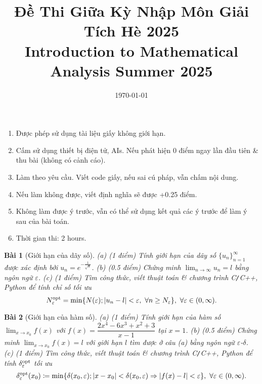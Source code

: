 \documentclass[12pt]{article}
\title{Đề Thi Giữa Kỳ Nhập Môn Giải Tích Hè 2025\\
	Introduction to Mathematical Analysis Summer 2025}
\date{\today}
\newtheorem{baitoan}{Bài}
\begin{document}
\maketitle
{}
\begin{enumerate}
	\item Được phép sử dụng tài liệu giấy không giới hạn.
	\item Cấm sử dụng thiết bị điện tử, AIs. Nếu phát hiện 0 điểm ngay lần đầu tiên \& thu bài (không có cảnh cáo).
	\item Làm theo yêu cầu. Viết code giấy, nếu sai cú pháp, vẫn chấm nội dung.
	\item Nếu làm không được, viết định nghĩa sẽ được +0.25 điểm.
	\item Không làm được ý trước, vẫn có thể sử dụng kết quả các ý trước để làm ý sau của bài toán.
    \item Thời gian thi: 2 hours.
\end{enumerate}

\begin{baitoan}[Giới hạn của dãy số]
	(a) {\rm(1 điểm)} Tính giới hạn của dãy số $\{u_n\}_{n=1}^\infty$ được xác định bởi $u_n = e^{-\frac{1}{\sqrt{n}}}$. (b) {\rm(0.5 điểm)} Chứng minh $\lim_{n\to\infty} u_n = l$ bằng ngôn ngữ $\varepsilon$. (c) {\rm(1 điểm)} Tìm công thức, viết thuật toán \& chương trình {\sf C{\tt/}C++, Python} để tính chỉ số tối ưu
	\begin{equation*}
		N_\varepsilon^{\rm opt} = \min\{N(\varepsilon);|u_n - l| < \varepsilon,\ \forall n\ge N_\varepsilon\},\ \forall\varepsilon\in(0,\infty).
	\end{equation*}
\end{baitoan}

\begin{baitoan}[Giới hạn của hàm số]
	(a) {\rm(1 điểm)} Tính giới hạn của hàm số $\lim_{x\to x_0} f(x)$ với $f(x) = \dfrac{2x^4 - 6x^3 + x^2 + 3}{x - 1}$ tại $x = 1$. (b) {\rm(0.5 điểm)} Chứng minh $\lim_{x\to x_0} f(x) = l$ với giới hạn $l$ tìm được ở câu (a) bằng ngôn ngữ $\varepsilon$-$\delta$. (c) {\rm(1 điểm)} Tìm công thức, viết thuật toán \& chương trình {\sf C{\tt/}C++, Python} để tính $\delta_\varepsilon^{\rm opt}$ tối ưu
	\begin{equation*}
		\delta_\varepsilon^{\rm opt}(x_0)\coloneqq\min\{\delta(x_0,\varepsilon);|x - x_0| < \delta(x_0,\varepsilon)\Rightarrow|f(x) - l| < \varepsilon\},\ \forall\varepsilon\in(0,\infty).
	\end{equation*}
\end{baitoan}
\end{document}

